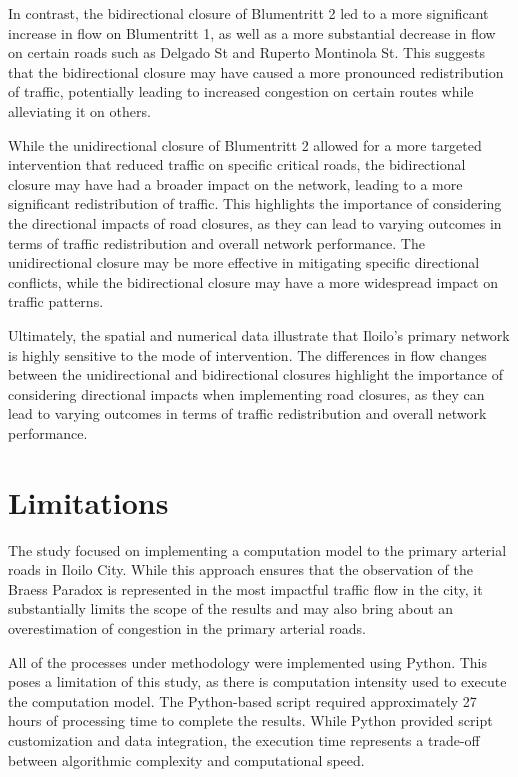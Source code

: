 In contrast, the bidirectional closure of Blumentritt 2 led to a more significant increase in flow on Blumentritt 1, as well as a more substantial decrease in flow on certain roads such as Delgado St and Ruperto Montinola St. This suggests that the bidirectional closure may have caused a more pronounced redistribution of traffic, potentially leading to increased congestion on certain routes while alleviating it on others. 

While the unidirectional closure of Blumentritt 2 allowed for a more targeted intervention that reduced traffic on specific critical roads, the bidirectional closure may have had a broader impact on the network, leading to a more significant redistribution of traffic. This highlights the importance of considering the directional impacts of road closures, as they can lead to varying outcomes in terms of traffic redistribution and overall network performance. The unidirectional closure may be more effective in mitigating specific directional conflicts, while the bidirectional closure may have a more widespread impact on traffic patterns.

Ultimately, the spatial and numerical data illustrate that Iloilo's primary network is highly sensitive to the mode of intervention. The differences in flow changes between the unidirectional and bidirectional closures highlight the importance of considering directional impacts when implementing road closures, as they can lead to varying outcomes in terms of traffic redistribution and overall network performance.


\section{Limitations}
\label{sec:limitations}

The study focused on implementing a computation model to the primary arterial roads in Iloilo City. While this approach ensures that the observation of the Braess Paradox is represented in the most impactful traffic flow in the city, it substantially limits the scope of the results and may also bring about an overestimation of congestion in the primary arterial roads.

All of the processes under methodology were implemented using Python. This poses a limitation of this study, as there is computation intensity used to execute the computation model. The Python-based script required approximately 27 hours of processing time to complete the results. While Python provided script customization and data integration, the execution time represents a trade-off between algorithmic complexity and computational speed. 

